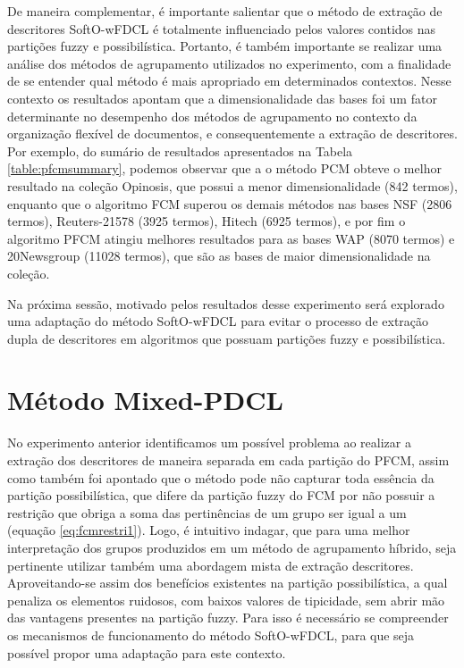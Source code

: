 De maneira complementar, é importante salientar que o método de extração de descritores SoftO-wFDCL é
totalmente influenciado pelos valores contidos nas partições fuzzy e possibilística. Portanto, é
também importante se realizar uma análise dos métodos de agrupamento utilizados no experimento, com
a finalidade de se entender qual método é mais apropriado em determinados contextos. Nesse contexto
os resultados apontam que a dimensionalidade das bases foi um fator determinante no desempenho dos
métodos de agrupamento no contexto da organização flexível de documentos, e consequentemente a
extração de descritores. Por exemplo, do sumário de resultados apresentados na Tabela
\ref{table:pfcmsummary}, podemos observar que a o método PCM obteve o melhor resultado na coleção
Opinosis, que possui a menor dimensionalidade (842 termos), enquanto que o algoritmo FCM superou os
demais métodos nas bases NSF (2806 termos), Reuters-21578 (3925 termos), Hitech (6925 termos), e por
fim o algoritmo PFCM atingiu melhores resultados para as bases WAP (8070 termos) e 20Newsgroup
(11028 termos), que são as bases de maior dimensionalidade na coleção.

Na próxima sessão, motivado pelos resultados desse experimento será explorado uma adaptação do
método SoftO-wFDCL para evitar o processo de extração dupla de descritores em algoritmos que possuam
partições fuzzy e possibilística.

\section{Método Mixed-PDCL}

No experimento anterior identificamos um possível problema ao realizar a extração dos
descritores de maneira separada em cada partição do PFCM, assim como também foi apontado que o
método pode não capturar toda essência da partição possibilística, que difere da partição fuzzy do
FCM por não possuir a restrição que obriga a soma das pertinências de um grupo ser igual a um
(equação \ref{eq:fcmrestri1}).
Logo, é intuitivo indagar, que para uma melhor interpretação dos grupos produzidos em um método de
agrupamento híbrido, seja pertinente utilizar também uma abordagem mista de extração descritores.
Aproveitando-se assim dos benefícios existentes na partição possibilística, a qual penaliza os
elementos ruidosos, com baixos valores de tipicidade, sem abrir mão das vantagens presentes na
partição fuzzy. Para isso é necessário se compreender os mecanismos de funcionamento do método
SoftO-wFDCL, para que seja possível propor uma adaptação para este contexto.

